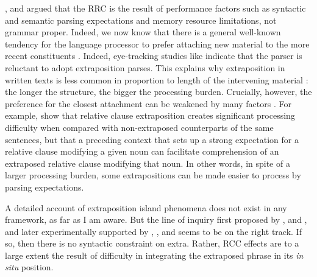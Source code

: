 \documentclass[output=paper
                ,modfonts
                ,nonflat
	        ,collection
	        ,collectionchapter
	        ,collectiontoclongg
 	        ,biblatex
                ,babelshorthands
                ,newtxmath
                ,draftmode
                ,colorlinks, citecolor=brown
]{./langsci/langscibook}
\begin{document}
\eal \label{nosubza}





\zl


 \citet{grosurrc},  \citet{gazdar} and \citet{stucky} argued that the RRC is the result of
  performance  factors such as  syntactic and semantic parsing expectations and  memory resource  limitations,  not grammar proper.   Indeed, we now know that  there is a general well-known  tendency for the language processor to  prefer attaching new material
 to the more recent constituents  \citep{frazcl,gibetal,trax98,fodor02b,fernandez03}. 
Indeed, eye-tracking studies like \citet{hnps}  indicate that the
parser is reluctant to adopt  extraposition  parses.
This  explains why     extraposition in written texts
is less common in proportion to length of  the  intervening material \citep{UBDKKOS98b}:
the longer the structure, the bigger the processing burden. 
 Crucially, however, the preference for the closest attachment can be weakened by
many factors \citep{fernandez03,desmet,devic,carreras}. 
For example,  \citet{levyted}  show that relative clause extraposition creates
 significant processing difficulty when compared with  non-extraposed counterparts of 
 the same sentences,   but that a preceding context that sets up a strong expectation
for a relative clause modifying a given noun can  facilitate
comprehension of an extraposed relative clause modifying that noun.
In other words, in spite of a larger processing burden,
some extrapositions can be made easier to process by parsing expectations.

A detailed account of extraposition island phenomena  does not exist in any framework, as far as I
am aware. But the line of inquiry first proposed by  \citet{grosurrc},  \citet{gazdar} and \citet{stucky},  and later experimentally supported by \citet{levyted}, \citet{strunk08}, and \citet{strunk} seems to be on the right track. If so, then there is no syntactic constraint on {\sc extra}. Rather, RCC effects are to a large extent the result of difficulty in integrating the extraposed phrase in its  \emph{in situ} position.  
\end{document}
